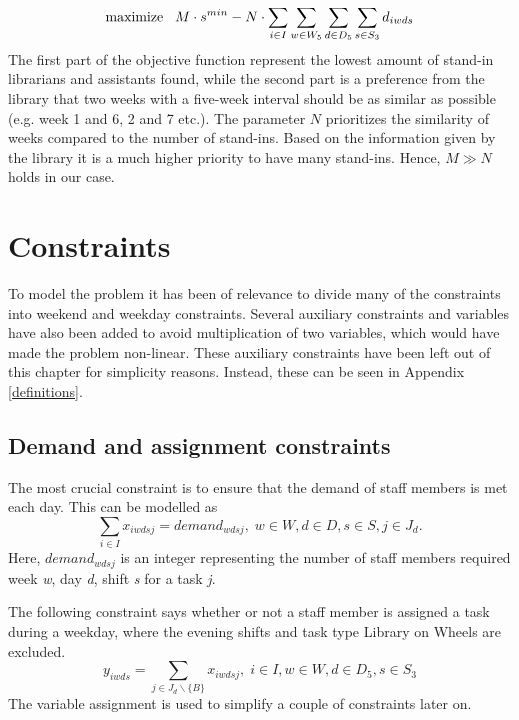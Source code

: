 \begin{equation} \label{objfcn}
\text{maximize} \hspace{0.3cm} M\cdot s^{min} - N \cdot \sum_{i \in I}\sum_{w \in W_5}\sum_{d \in D_5}\sum_{s \in S_3} d_{iwds}
\end{equation}
The first part of the objective function represent the lowest amount of stand-in librarians and assistants found, while the second part is a preference from the library that two weeks with a five-week interval should be as similar as possible (e.g. week 1 and 6, 2 and 7 etc.). The parameter $N$ prioritizes the similarity of weeks compared to the number of stand-ins. Based on the information given by the library it is a much higher priority to have many stand-ins. Hence, $M \gg N$ holds in our case.




\section{Constraints} \label{constraints}
To model the problem it has been of relevance to divide many of the constraints into weekend and weekday constraints. Several auxiliary constraints and variables have also been added to avoid multiplication of two variables, which would have made the problem non-linear. These auxiliary constraints have been left out of this chapter for simplicity reasons. Instead, these can be seen in Appendix \ref{definitions}.

\subsection{Demand and assignment constraints} \label{section:demand_ass_constraints}
The most crucial constraint is to ensure that the demand of staff members is met each day. This can be modelled as
\begin{equation} \label{eq:demand}
\sum_{i \in I} x_{iwdsj} = demand_{wdsj}, \;   w\in W,d\in D,s\in S,j\in J_d.
\end{equation}
Here, $demand_{wdsj}$ is an integer representing the number of staff members required week \textit{w}, day \textit{d}, shift \textit{s} for a task \textit{j}.

The following constraint says whether or not a staff member is assigned a task during a weekday, where the evening shifts and task type Library on Wheels are excluded.
\begin{equation} \label{constr:y_assign}
y_{iwds} = \sum_{j \in J_d\backslash \{B\}} x_{iwdsj}, \;   i \in I, w \in W, d \in D_5, s \in S_3
\end{equation}
The variable assignment is used to simplify a couple of constraints later on.

